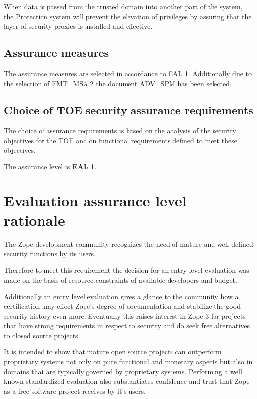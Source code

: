 \documentclass[12pt,english]{scrbook}
\begin{document}
When data is passed from the trusted domain into another part of the system,
the Protection system will prevent the elevation of privileges by assuring that
the layer of security proxies is installed and effective.

\subsection{Assurance measures}

The assurance measures are selected in accordance to EAL 1. Additionally due to
the selection of FMT\_MSA.2 the document ADV\_SPM has been selected.


\subsection{Choice of TOE security assurance requirements}

The choice of assurance requirements is based on the analysis of the security
objectives for the TOE and on functional requirements defined to meet these
objectives.

The assurance level is \textbf{EAL 1}.



\section{Evaluation assurance level rationale}

The Zope development community recognizes the need of mature and well defined
security functions by its users.

Therefore to meet this requirement the decision for an entry level evaluation
was made on the basis of resource constraints of available developers and
budget.

Additionally an entry level evaluation gives a glance to the community how a
certification may effect Zope's degree of documentation and stabilize the good
security history even more. Eventually this raises interest in Zope 3 for
projects that have strong requirements in respect to security and do seek free
alternatives to closed source projects.

It is intended to show that mature open source projects can outperform
proprietary systems not only on pure functional and monetary aspects but also
in domains that are typically governed by proprietary systems. Performing a
well known standardized evaluation also substantiates confidence and trust that
Zope as a free software project receives by it's users.
\end{document}
